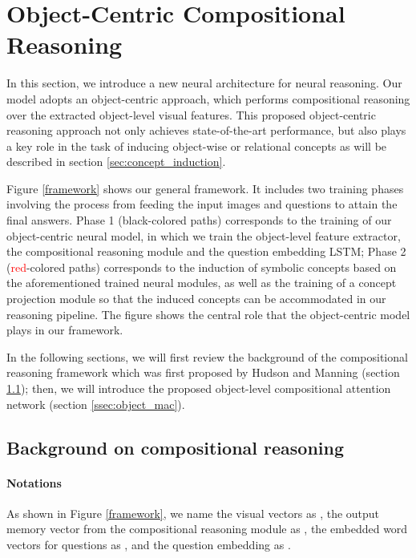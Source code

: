 \documentclass[final]{cvpr}
\begin{document}
\section{Object-Centric Compositional Reasoning}
In this section, we introduce a new neural architecture for neural reasoning.
Our model adopts an object-centric approach, which performs compositional reasoning over the extracted object-level visual features.
This proposed object-centric reasoning approach not only achieves state-of-the-art performance, but also plays a key role in the task of inducing object-wise or relational concepts as will be described in section \ref{sec:concept_induction}.

Figure \ref{framework} shows our general framework. It includes two training phases involving the process from feeding the input images and questions to attain the final answers.
Phase 1 (black-colored paths) corresponds to the training of our object-centric neural model, in which we train the object-level feature extractor, the compositional reasoning module and the question embedding LSTM; 
Phase 2 (\textcolor{red}{red}-colored paths) corresponds to the induction of symbolic concepts based on the aforementioned trained neural modules, as well as the training of a concept projection module so that the induced concepts can be accommodated in our reasoning pipeline. 
The figure shows the central role that the object-centric model plays in our framework.





In the following sections, we will first review the background of the compositional reasoning framework which was first proposed by Hudson and Manning \cite{hudson2018compositional} (section \ref{ssec:mac}); then, we will introduce the proposed object-level compositional attention network (section \ref{ssec:object_mac}). 


\subsection{Background on compositional reasoning}
\label{ssec:mac}
\paragraph{Notations} As shown in Figure \ref{framework}, we name the visual vectors as , the output memory vector from the compositional reasoning module as , the embedded word vectors for questions as , and the question embedding as . 
\vspace{-3mm}
\end{document}

